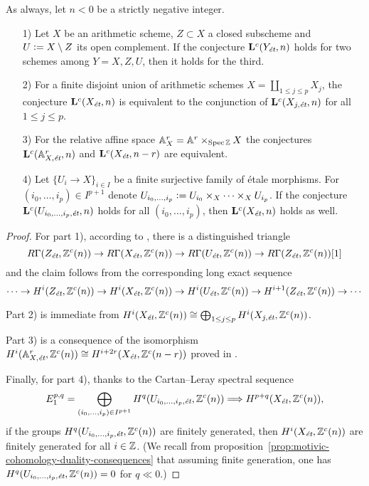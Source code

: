 \documentclass{article}
\numberwithin{equation}{section}
\begin{document}
\begin{lemma}
  \label{lemma:Lc(Xet)-operations}
  As always, let $n < 0$ be a strictly negative integer.

  \begin{enumerate}
  \item[1)] Let $X$ be an arithmetic scheme, $Z \subset X$ a closed subscheme
    and $U \dfn X\setminus Z$ its open complement. If the conjecture
    $\mathbf{L}^c (Y_\et,n)$ holds for two schemes among $Y = X,Z,U$, then it
    holds for the third.

  \item[2)] For a finite disjoint union of arithmetic schemes
    $X = \coprod_{1 \le j \le p} X_j$, the conjecture $\mathbf{L}^c (X_\et,n)$
    is equivalent to the conjunction of $\mathbf{L}^c (X_{j,\et},n)$ for all
    $1 \le j \le p$.

  \item[3)] For the relative affine space $\AA^r_X = \AA^r \times_{\Spec \ZZ} X$
    the conjectures $\mathbf{L}^c (\AA^r_{X,\et},n)$ and
    $\mathbf{L}^c (X_\et,n-r)$ are equivalent.

  \item[4)] Let $\{ U_i \to X \}_{i \in I}$ be a finite surjective family of
    étale morphisms. For $(i_0,\ldots,i_p) \in I^{p+1}$ denote
    $U_{i_0,\ldots,i_p} \dfn U_{i_0} \times_X \cdots \times_X U_{i_p}$.
    If the conjecture $\mathbf{L}^c (U_{i_0,\ldots,i_p, \et},n)$ holds for all
    $(i_0,\ldots,i_p)$, then $\mathbf{L}^c (X_\et,n)$ holds as well.
  \end{enumerate}

  \begin{proof}
    For part 1), according to \cite[Corollary~7.2]{Geisser-2010}, there is a
    distinguished triangle
    \[ R\Gamma (Z_\et, \ZZ^c (n)) \to
       R\Gamma (X_\et, \ZZ^c (n)) \to
       R\Gamma (U_\et, \ZZ^c (n)) \to
       R\Gamma (Z_\et, \ZZ^c (n)) [1] \]
    and the claim follows from the corresponding long exact sequence
    \[ \cdots \to H^i (Z_\et, \ZZ^c (n)) \to
       H^i (X_\et, \ZZ^c (n)) \to
       H^i (U_\et, \ZZ^c (n)) \to
       H^{i+1} (Z_\et, \ZZ^c (n)) \to \cdots \]

    Part 2) is immediate from
    $H^i (X_\et, \ZZ^c (n)) \cong \bigoplus_{1 \le j \le p} H^i (X_{j,\et}, \ZZ^c (n))$.

    Part 3) is a consequence of the isomorphism
    $H^i (\AA^r_{X,\et}, \ZZ^c (n)) \cong H^{i+2r} (X_\et, \ZZ^c (n-r))$
    proved in \cite[Lemma~5.11]{Morin-2014}.

    Finally, for part 4), thanks to the Cartan--Leray spectral sequence
    \[ E_1^{p,q} = \bigoplus_{(i_0,\ldots,i_p) \in I^{p+1}} H^q (U_{i_0,\ldots,i_p, \et}, \ZZ^c (n))
      \Longrightarrow H^{p+q} (X_\et, \ZZ^c (n)), \]
    if the groups $H^q (U_{i_0,\ldots,i_p, \et}, \ZZ^c (n))$ are finitely
    generated, then $H^i (X_\et, \ZZ^c (n))$ are finitely generated for all
    $i\in \ZZ$.
    (We recall from
    proposition~\ref{prop:motivic-cohomology-duality-consequences} that assuming
    finite generation, one has $H^q (U_{i_0,\ldots,i_p, \et}, \ZZ^c (n)) = 0$
    for $q \ll 0$.)
  \end{proof}
\end{lemma}
\end{document}
